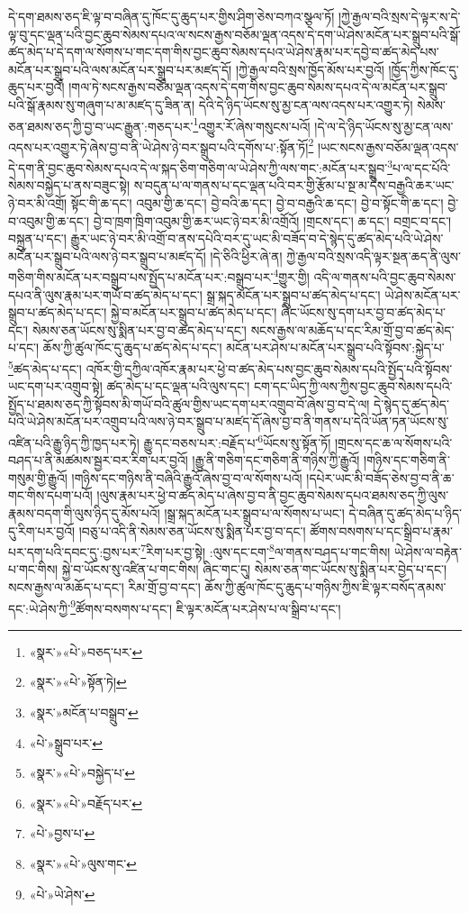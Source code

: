 དེ་དག་ཐམས་ཅད་ཇི་ལྟ་བ་བཞིན་དུ་ཁོང་དུ་ཆུད་པར་གྱིས་ཤིག་ཅེས་བཀའ་སྩལ་ཏོ། །ཀྱེ་རྒྱལ་བའི་སྲས་དེ་ལྟར་ས་དེ་ལྟ་བུ་དང་ལྡན་པའི་བྱང་ཆུབ་སེམས་དཔའ་ལ་སངས་རྒྱས་བཅོམ་ལྡན་འདས་དེ་དག་ཡེ་ཤེས་མངོན་པར་སྒྲུབ་པའི་སྒོ་ཚད་མེད་པ་དེ་དག་ལ་སོགས་པ་གང་དག་གིས་བྱང་ཆུབ་སེམས་དཔའ་ཡེ་ཤེས་རྣམ་པར་དབྱེ་བ་ཚད་མེད་པས་མངོན་པར་སྒྲུབ་པའི་ལས་མངོན་པར་སྒྲུབ་པར་མཛད་དོ། །ཀྱེ་རྒྱལ་བའི་སྲས་ཁྱོད་མོས་པར་བྱའོ། །ཁྱོད་ཀྱིས་ཁོང་དུ་ཆུད་པར་བྱའོ། །གལ་ཏེ་སངས་རྒྱས་བཅོམ་ལྡན་འདས་དེ་དག་གིས་བྱང་ཆུབ་སེམས་དཔའ་དེ་ལ་མངོན་པར་སྒྲུབ་པའི་སྒོ་རྣམས་སུ་གཞུག་པ་མ་མཛད་དུ་ཟིན་ན། དེའི་དེ་ཉིད་ཡོངས་སུ་མྱ་ངན་ལས་འདས་པར་འགྱུར་ཏེ། སེམས་ཅན་ཐམས་ཅད་ཀྱི་བྱ་བ་ཡང་རྒྱུན་:གཅད་པར་\footnote{«སྣར་»«པེ་»བཅད་པར་}འགྱུར་རོ་ཞེས་གསུངས་པའོ། །དེ་ལ་དེ་ཉིད་ཡོངས་སུ་མྱ་ངན་ལས་འདས་པར་འགྱུར་ཏེ་ཞེས་བྱ་བ་ནི་ཡེ་ཤེས་ཉེ་བར་སྒྲུབ་པའི་དགོས་པ་:སྟོན་ཏོ།\footnote{«སྣར་»«པེ་»སྟོན་ཏེ།} །ཡང་སངས་རྒྱས་བཅོམ་ལྡན་འདས་དེ་དག་ནི་བྱང་ཆུབ་སེམས་དཔའ་དེ་ལ་སྐད་ཅིག་གཅིག་ལ་ཡེ་ཤེས་ཀྱི་ལས་གང་:མངོན་པར་སྒྲུབ་\footnote{«སྣར་»མངོན་པ་བསྒྲུབ་}པ་ལ་དང་པོའི་སེམས་བསྐྱེད་པ་ནས་བཟུང་སྟེ། ས་བདུན་པ་ལ་གནས་པ་དང་ལྡན་པའི་བར་གྱི་རྩོམ་པ་སྔ་མ་དེས་བརྒྱའི་ཆར་ཡང་ཉེ་བར་མི་འགྲོ། སྟོང་གི་ཆ་དང་། འབུམ་གྱི་ཆ་དང་། བྱེ་བའི་ཆ་དང་། བྱེ་བ་བརྒྱའི་ཆ་དང་། བྱེ་བ་སྟོང་གི་ཆ་དང་། བྱེ་བ་འབུམ་གྱི་ཆ་དང་། བྱེ་བ་ཁྲག་ཁྲིག་འབུམ་གྱི་ཆར་ཡང་ཉེ་བར་མི་འགྲོའོ། །གྲངས་དང་། ཆ་དང་། བགྲང་བ་དང་། བསྐྲུན་པ་དང་། རྒྱུར་ཡང་ཉེ་བར་མི་འགྲོ་བ་ནས་དཔེའི་བར་དུ་ཡང་མི་བཟོད་བ་དེ་སྙེད་དུ་ཚད་མེད་པའི་ཡེ་ཤེས་མངོན་པར་སྒྲུབ་པའི་ལས་ཉེ་བར་སྒྲུབ་པ་མཛད་དོ། །དེ་ཅིའི་ཕྱིར་ཞེ་ན། ཀྱེ་རྒྱལ་བའི་སྲས་འདི་ལྟར་སྔན་ཆད་ནི་ལུས་གཅིག་གིས་མངོན་པར་བསྒྲུབ་པས་སྤྱོད་པ་མངོན་པར་:བསྒྲུབ་པར་\footnote{«པེ་»སྒྲུབ་པར་}གྱུར་གྱི། འདི་ལ་གནས་པའི་བྱང་ཆུབ་སེམས་དཔའ་ནི་ལུས་རྣམ་པར་གཡོ་བ་ཚད་མེད་པ་དང་། སྒྲ་སྐད་མངོན་པར་སྒྲུབ་པ་ཚད་མེད་པ་དང་། ཡེ་ཤེས་མངོན་པར་སྒྲུབ་པ་ཚད་མེད་པ་དང་། སྐྱེ་བ་མངོན་པར་སྒྲུབ་པ་ཚད་མེད་པ་དང་། ཞིང་ཡོངས་སུ་དག་པར་བྱ་བ་ཚད་མེད་པ་དང་། སེམས་ཅན་ཡོངས་སུ་སྨིན་པར་བྱ་བ་ཚད་མེད་པ་དང་། སངས་རྒྱས་ལ་མཆོད་པ་དང་རིམ་གྲོ་བྱ་བ་ཚད་མེད་པ་དང་། ཆོས་ཀྱི་ཚུལ་ཁོང་དུ་ཆུད་པ་ཚད་མེད་པ་དང་། མངོན་པར་ཤེས་པ་མངོན་པར་སྒྲུབ་པའི་སྟོབས་:སྐྱེད་པ་\footnote{«སྣར་»«པེ་»བསྐྱེད་པ་}ཚད་མེད་པ་དང་། འཁོར་གྱི་དཀྱིལ་འཁོར་རྣམ་པར་ཕྱེ་བ་ཚད་མེད་པས་བྱང་ཆུབ་སེམས་དཔའི་སྤྱོད་པའི་སྟོབས་ཡང་དག་པར་འགྲུབ་སྟེ། ཚད་མེད་པ་དང་ལྡན་པའི་ལུས་དང་། ངག་དང་ཡིད་ཀྱི་ལས་ཀྱིས་བྱང་ཆུབ་སེམས་དཔའི་སྤྱོད་པ་ཐམས་ཅད་ཀྱི་སྟོབས་མི་གཡོ་བའི་ཚུལ་གྱིས་ཡང་དག་པར་འགྲུབ་བོ་ཞེས་བྱ་བ་དེ་ལ། དེ་སྙེད་དུ་ཚད་མེད་པའི་ཡེ་ཤེས་མངོན་པར་འགྲུབ་པའི་ལས་ཉེ་བར་སྒྲུབ་པ་མཛད་དོ་ཞེས་བྱ་བ་ནི་གནས་པ་དེའི་ཡོན་ཏན་ཡོངས་སུ་འཛིན་པའི་རྒྱུ་ཉིད་ཀྱི་ཁྱད་པར་ཏེ། རྒྱུ་དང་བཅས་པར་:བརྗོད་པ་\footnote{«སྣར་»«པེ་»བརྗོད་པར་}ཡོངས་སུ་སྟོན་ཏོ། །གྲངས་དང་ཆ་ལ་སོགས་པའི་བཤད་པ་ནི་མཚམས་སྦྱར་བར་རིག་པར་བྱའོ། །རྒྱུ་ནི་གཅིག་དང་གཅིག་ནི་གཉིས་ཀྱི་རྒྱུའོ། །གཉིས་དང་གཅིག་ནི་གསུམ་གྱི་རྒྱུའོ། །གཉིས་དང་གཉིས་ནི་བཞིའི་རྒྱུའོ་ཞེས་བྱ་བ་ལ་སོགས་པའོ། །དཔེར་ཡང་མི་བཟོད་ཅེས་བྱ་བ་ནི་ཆ་གང་གིས་དཔག་པའོ། །ལུས་རྣམ་པར་ཕྱེ་བ་ཚད་མེད་པ་ཞེས་བྱ་བ་ནི་བྱང་ཆུབ་སེམས་དཔའ་ཐམས་ཅད་ཀྱི་ལུས་རྣམས་བདག་གི་ལུས་ཉིད་དུ་མོས་པའོ། །སྒྲ་སྐད་མངོན་པར་སྒྲུབ་པ་ལ་སོགས་པ་ཡང་། དེ་བཞིན་དུ་ཚད་མེད་པ་ཉིད་དུ་རིག་པར་བྱའོ། །བཅུ་པ་འདི་ནི་སེམས་ཅན་ཡོངས་སུ་སྨིན་པར་བྱ་བ་དང་། ཚོགས་བསགས་པ་དང་སྒྲིབ་པ་རྣམ་པར་དག་པའི་དབང་དུ་:བྱས་པར་\footnote{«པེ་»བྱས་པ་}རིག་པར་བྱ་སྟེ། :ལུས་དང་ངག་\footnote{«སྣར་»«པེ་»ལུས་གང་}ལ་གནས་བཤད་པ་གང་གིས། ཡེ་ཤེས་ལ་བརྟེན་པ་གང་གིས། སྐྱེ་བ་ཡོངས་སུ་འཛིན་པ་གང་གིས། ཞིང་གང་དུ། སེམས་ཅན་གང་ཡོངས་སུ་སྨིན་པར་བྱེད་པ་དང་། སངས་རྒྱས་ལ་མཆོད་པ་དང་། རིམ་གྲོ་བྱ་བ་དང་། ཆོས་ཀྱི་ཚུལ་ཁོང་དུ་ཆུད་པ་གཉིས་ཀྱིས་ཇི་ལྟར་བསོད་ནམས་དང་:ཡེ་ཤེས་ཀྱི་\footnote{«པེ་»ཡེ་ཤེས་}ཚོགས་བསགས་པ་དང་། ཇི་ལྟར་མངོན་པར་ཤེས་པ་ལ་སྒྲིབ་པ་དང་། 